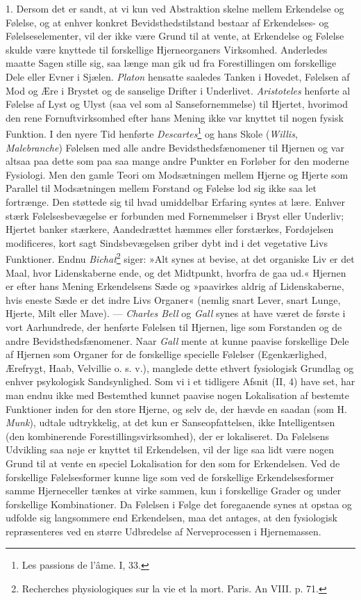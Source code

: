 \documentclass[12pt,a4paper,openany]{book}
\newcommand{\opage}[1]{\marginnote{\footnotesize\textit{[#1]}}}
\begin{document}
1. Dersom det er sandt, at vi kun ved Abstraktion skelne mellem
Erkendelse og Følelse, og at enhver konkret Bevidsthedstilstand bestaar
af Erkendelses- og Følelseselementer, vil der ikke være Grund til at
vente, at Erkendelse og Følelse skulde være knyttede til forskellige
Hjerneorganers Virksomhed. Anderledes maatte Sagen stille sig, saa længe
man gik ud fra Forestillingen om forskellige Dele eller Evner i Sjælen.
\emph{Platon} hensatte saaledes Tanken i Hovedet, Følelsen af Mod og Ære
i Brystet og de sanselige Drifter i Underlivet. \emph{Aristoteles}
henførte al Følelse af Lyst og Ulyst (saa vel som al Sansefornemmelse)
til Hjertet, hvorimod den rene Fornuftvirksomhed efter hans Mening ikke
var knyttet til nogen fysisk Funktion. I den nyere Tid henførte
\emph{Descartes}\footnote[1]{Les passions de l’âme. I, 33.} og hans
Skole (\emph{Willis}, \emph{Malebranche}) Følelsen med alle andre
Bevidsthedsfænomener til Hjernen og var altsaa paa dette som paa saa
mange andre Punkter en Forløber for den moderne Fysiologi. Men den gamle
Teori om Modsætningen mellem Hjerne og Hjerte som
\opage{319}Parallel til Modsætningen mellem Forstand og Følelse lod sig
ikke saa let fortrænge. Den støttede sig til hvad umiddelbar Erfaring
syntes at lære. Enhver stærk Følelsesbevægelse er forbunden med
Fornemmelser i Bryst eller Underliv; Hjertet banker stærkere,
Aandedrættet hæmmes eller forstærkes, Fordøjelsen modificeres, kort sagt
Sindsbevægelsen griber dybt ind i det vegetative Livs Funktioner. Endnu
\emph{Bichat}\footnote[1]{Recherches physiologiques sur la vie et la
mort. Paris. An VIII. p. 71.} siger: »Alt synes at bevise, at det
organiske Liv er det Maal, hvor Lidenskaberne ende, og det Midtpunkt,
hvorfra de gaa ud.« Hjernen er efter hans Mening Erkendelsens Sæde og
»paavirkes aldrig af Lidenskaberne, hvis eneste Sæde er det indre Livs
Organer« (nemlig snart Lever, snart Lunge, Hjerte, Milt eller Mave). ---
\emph{Charles Bell} og \emph{Gall} synes at have været de første i vort
Aarhundrede, der henførte Følelsen til Hjernen, lige som Forstanden og
de andre Bevidsthedsfænomener. Naar \emph{Gall} mente at kunne paavise
forskellige Dele af Hjernen som Organer for de forskellige specielle
Følelser (Egenkærlighed, Ærefrygt, Haab, Velvillie o. s. v.), manglede
dette ethvert fysiologisk Grundlag og enhver psykologisk Sandsynlighed.
Som vi i et tidligere Afsnit (II, 4) have set, har man endnu ikke med
Bestemthed kunnet paavise nogen Lokalisation af bestemte Funktioner
inden for den store Hjerne, og selv de, der hævde en saadan (som H.
\emph{Munk}), udtale udtrykkelig, at det kun er Sanseopfattelsen, ikke
Intelligentsen (den kombinerende Forestillingsvirksomhed), der er
lokaliseret. Da Følelsens Udvikling saa nøje er knyttet til Erkendelsen,
vil der lige saa lidt være nogen Grund til at vente en speciel
Lokalisation for den som for Erkendelsen. Ved de forskellige
Følelsesformer kunne lige som ved de forskellige Erkendelsesformer samme
Hjerneceller tænkes at virke sammen, kun i forskellige Grader og under
forskellige Kombinationer. Da Følelsen i Følge det foregaaende synes at
opstaa og udfolde sig langsommere end Erkendelsen, maa det antages, at
den fysiologisk repræsenteres ved en større Udbredelse af Nerveprocessen
i Hjernemassen.
\end{document}
